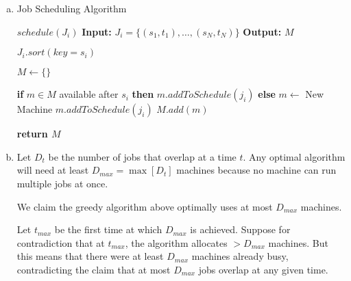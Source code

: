 \documentclass[10pt]{article}
\begin{document}
\begin{solution}
    
    \begin{enumerate}[(a)]
        \item {

            \begin{algorithm}
                \caption{Job Scheduling Algorithm}
                \begin{algorithmic}
                    \Statex $schedule(J_i)$
                    \Statex \textbf{Input:} $J_i = \{(s_1, t_1), \dots, (s_N, t_N)\}$
                    \Statex \textbf{Output: } $M$

                    \State $J_i.sort(key=s_i)$

                    \State $M \gets \{\}$

                        \State \textbf{if} $m \in M$ available after $s_i$ \textbf{then}
                            \State \qquad $m.addToSchedule(j_i)$
                        \State \textbf{else}
                            \State \qquad $m \gets $ New Machine
                            \State \qquad $m.addToSchedule(j_i)$
                            \State \qquad $M.add(m)$
                    \EndFor

                    \State \textbf{return $M$}

                \end{algorithmic}
            \end{algorithm}

        }
        \item {
            Let $D_t$ be the number of jobs that overlap at a time $t$. 
            Any optimal algorithm will need at least $D_{max} = \max[D_t]$ 
            machines because no machine can run multiple jobs at once. 

            We claim the greedy algorithm above optimally uses at most $D_{max}$ 
            machines. 

            Let $t_{max}$ be the first time at which $D_{max}$ is achieved. 
            Suppose for contradiction that at $t_{max}$, the algorithm allocates 
            $>D_{max}$ machines. 
            But this means that there were at least $D_{max}$ machines already 
            busy, contradicting the claim that at most $D_{max}$ jobs overlap 
            at any given time. 

        }

    \end{enumerate}

\end{solution}
\newpage
\end{document}
